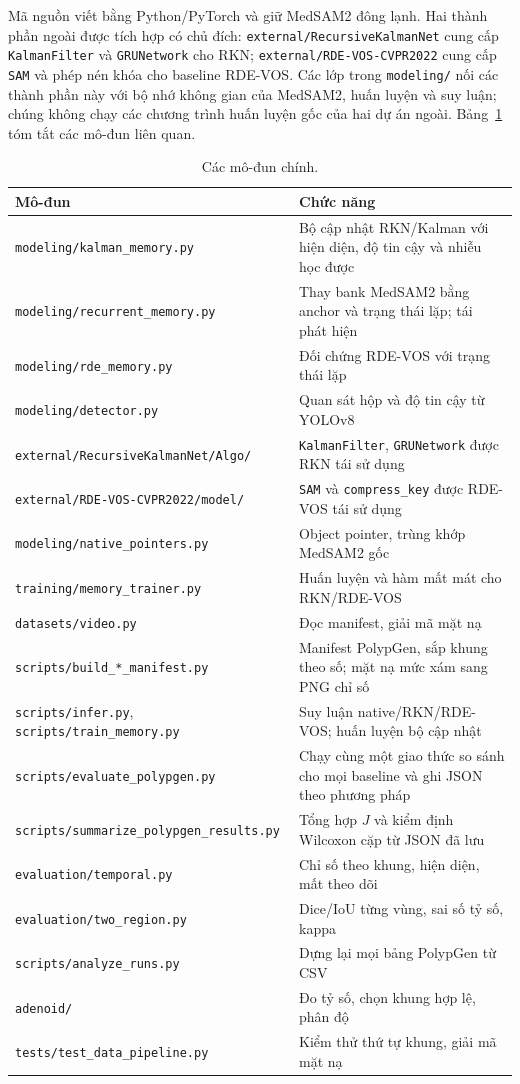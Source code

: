 \documentclass[a4paper,12pt]{report}
\begin{document}
Mã nguồn viết bằng Python/PyTorch và giữ MedSAM2 đông lạnh. Hai thành phần ngoài được tích hợp có chủ đích: \texttt{external/RecursiveKalmanNet} cung cấp \texttt{KalmanFilter} và \texttt{GRUNetwork} cho RKN; \texttt{external/RDE-VOS-CVPR2022} cung cấp \texttt{SAM} và phép nén khóa cho baseline RDE-VOS. Các lớp trong \texttt{modeling/} nối các thành phần này với bộ nhớ không gian của MedSAM2, huấn luyện và suy luận; chúng không chạy các chương trình huấn luyện gốc của hai dự án ngoài. Bảng~\ref{tab:modules} tóm tắt các mô-đun liên quan.

\begin{table}[htbp]
\centering
\caption{Các mô-đun chính.}
\label{tab:modules}
\small
\begin{tabular}{>{\footnotesize}p{5.7cm}p{6.2cm}}
\hline
Mô-đun & Chức năng \\
\hline
\texttt{modeling/kalman\_memory.py} & Bộ cập nhật RKN/Kalman với hiện diện, độ tin cậy và nhiễu học được \\
\texttt{modeling/recurrent\_memory.py} & Thay bank MedSAM2 bằng anchor và trạng thái lặp; tái phát hiện \\
\texttt{modeling/rde\_memory.py} & Đối chứng RDE-VOS với trạng thái lặp \\
\texttt{modeling/detector.py} & Quan sát hộp và độ tin cậy từ YOLOv8 \\
\texttt{external/RecursiveKalmanNet/Algo/} & \texttt{KalmanFilter}, \texttt{GRUNetwork} được RKN tái sử dụng \\
\texttt{external/RDE-VOS-CVPR2022/model/} & \texttt{SAM} và \texttt{compress\_key} được RDE-VOS tái sử dụng \\
\texttt{modeling/native\_pointers.py} & Object pointer, trùng khớp MedSAM2 gốc \\
\texttt{training/memory\_trainer.py} & Huấn luyện và hàm mất mát cho RKN/RDE-VOS \\
\texttt{datasets/video.py} & Đọc manifest, giải mã mặt nạ \\
\texttt{scripts/build\_*\_manifest.py} & Manifest PolypGen, sắp khung theo số; mặt nạ mức xám sang PNG chỉ số \\
\texttt{scripts/infer.py}, \texttt{scripts/train\_memory.py} & Suy luận native/RKN/RDE-VOS; huấn luyện bộ cập nhật \\
\texttt{scripts/evaluate\_polypgen.py} & Chạy cùng một giao thức so sánh cho mọi baseline và ghi JSON theo phương pháp \\
\texttt{scripts/summarize\_polypgen\_results.py} & Tổng hợp $J$ và kiểm định Wilcoxon cặp từ JSON đã lưu \\
\texttt{evaluation/temporal.py} & Chỉ số theo khung, hiện diện, mất theo dõi \\
\texttt{evaluation/two\_region.py} & Dice/IoU từng vùng, sai số tỷ số, kappa \\
\texttt{scripts/analyze\_runs.py} & Dựng lại mọi bảng PolypGen từ CSV \\
\texttt{adenoid/} & Đo tỷ số, chọn khung hợp lệ, phân độ \\
\texttt{tests/test\_data\_pipeline.py} & Kiểm thử thứ tự khung, giải mã mặt nạ \\
\hline
\end{tabular}
\end{table}
\end{document}

